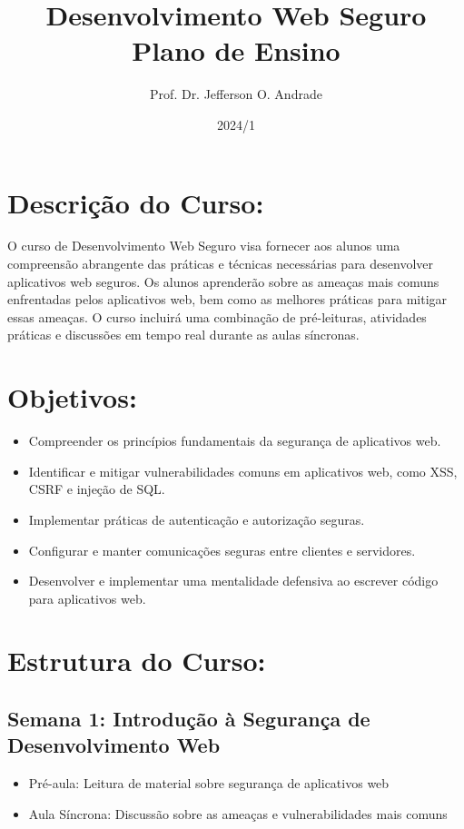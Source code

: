 \documentclass{scrartcl}
\author{Prof. Dr. Jefferson O. Andrade}
\date{2024/1}
\title{Desenvolvimento Web Seguro\\\medskip
\large Plano de Ensino}
\begin{document}
\maketitle

\section{Descrição do Curso:}
\label{sec:orgd3749b8}
O curso de Desenvolvimento Web Seguro visa fornecer aos alunos uma compreensão
abrangente das práticas e técnicas necessárias para desenvolver aplicativos web
seguros. Os alunos aprenderão sobre as ameaças mais comuns enfrentadas pelos
aplicativos web, bem como as melhores práticas para mitigar essas ameaças. O
curso incluirá uma combinação de pré-leituras, atividades práticas e discussões
em tempo real durante as aulas síncronas.

\section{Objetivos:}
\label{sec:org4826256}
\begin{itemize}
\item Compreender os princípios fundamentais da segurança de aplicativos web.
\item Identificar e mitigar vulnerabilidades comuns em aplicativos web, como XSS, CSRF e injeção de SQL.
\item Implementar práticas de autenticação e autorização seguras.
\item Configurar e manter comunicações seguras entre clientes e servidores.
\item Desenvolver e implementar uma mentalidade defensiva ao escrever código para aplicativos web.
\end{itemize}

\section{Estrutura do Curso:}
\label{sec:orgc859610}

\subsection{Semana 1: Introdução à Segurança de Desenvolvimento Web}
\label{sec:org8110ba5}
\begin{itemize}
\item Pré-aula: Leitura de material sobre segurança de aplicativos web
\item Aula Síncrona: Discussão sobre as ameaças e vulnerabilidades mais comuns
\end{itemize}
\end{document}

